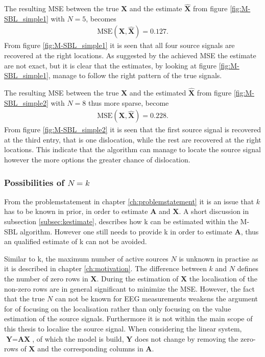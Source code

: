 \noindent
The resulting MSE between the true $\mathbf{X}$ and the estimate $\hat{\mathbf{X}}$ from figure \ref{fig:M-SBL_simple1} with $N = 5$, becomes 
\begin{align*}
\text{MSE}(\mathbf{X}, \hat{\mathbf{X}}) = 0.127.
\end{align*}
From figure \ref{fig:M-SBL_simple1} it is seen that all four source signals are recovered at the right locations. 
As suggested by the achieved MSE the estimate are not exact, but it is clear that the estimates, by looking at figure \ref{fig:M-SBL_simple1}, manage to follow the right pattern of the true signals. 

The resulting MSE between the true $\mathbf{X}$ and the estimated $\hat{\mathbf{X}}$ from figure \ref{fig:M-SBL_simple2} with $N = 8$ thus more sparse, become 
\begin{align*}
\text{MSE}(\mathbf{X}, \hat{\mathbf{X}}) = 0.228. 
\end{align*}
From figure \ref{fig:M-SBL_simple2} it is seen that the first source signal is recovered at the third entry, that is one dislocation, while the rest are recovered at the right locations. 
This indicate that the algorithm can manage to locate the source signal however the more options the greater chance of dislocation.     

\subsubsection*{Possibilities of $N=k$}

From the problemstatement in chapter \ref{ch:problemstatement} it is an issue that $k$ has to be known in prior, in order to estimate $\textbf{A}$ and $\textbf{X}$. A short discussion in subsection \ref{subsec:kestimate}, describes how k can be estimated within the M-SBL algorithm. However one still needs to provide k in order to estimate $\textbf{A}$, thus an qualified estimate of k can not be avoided. 

Similar to k, the maximum number of active sources $N$ is unknown in practise as it is described in chapter \ref{ch:motivation}. 
The difference between $k$ and $N$ defines the number of zero rows in $\textbf{X}$.
During the estimation of $\textbf{X}$ the localisation of the non-zero rows are in general significant to minimize the MSE. However, the fact that the true $N$ can not be known for EEG measurements weakens the argument for of focusing on the localisation rather than only focusing on the value estimation of the source signals. Furthermore it is not within the main scope of this thesis to localise the source signal.  
When considering the linear system, $\textbf{Y}=\textbf{AX}$, of which the model is build, $\textbf{Y}$ does not change by removing the zero-rows of $\textbf{X}$ and the corresponding columns in $\textbf{A}$.
 
